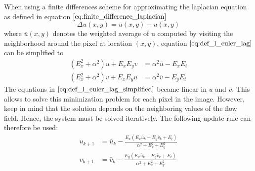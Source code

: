 When using a finite differences scheme for approximating the laplacian equation
as defined in equation $\ref{eq:finite_difference_laplacian}$
\begin{equation}
	\Delta u(x,y) = \bar{u} (x,y) - u(x,y)
\label{eq:finite_difference_laplacian}
\end{equation}
where $\bar{u} (x,y)$ denotes the weighted average of u computed by visiting the neighborhood around the pixel at location $(x,y)$, equation $\ref{eq:def_l_euler_lag}$ can be simplified to
\begin{equation}
\begin{aligned}
(E_x^2 + \alpha^2) u + E_x E_y v &= \alpha^2 \bar{u} - E_x E_t \\
(E_x^2 + \alpha^2) v + E_x E_y u &= \alpha^2 \bar{v} - E_y E_t
\end{aligned}
\label{eq:def_l_euler_lag_simplified}
\end{equation}
The equations in $\ref{eq:def_l_euler_lag_simplified}$ became linear in $u$ and $v$. This allows to solve this minimization problem for each pixel in the image. However, keep in mind that the solution depends on the neighboring values of the flow field. Hence, the system must be solved iteratively. The following update rule can therefore be used:
\begin{equation}
\begin{aligned}
 u_{k+1} &= \bar{u}_k - \frac{E_x (E_x \bar{u}_k + E_y \bar{v}_k + E_t)}{\alpha^2 + E_x^2 + E_y^2} \\
  v_{k+1} &= \bar{v}_k - \frac{E_y (E_x \bar{u}_k + E_y \bar{v}_k + E_t)}{\alpha^2 + E_x^2 + E_y^2}
\end{aligned}
\label{eq:hs_iteration}
\end{equation}

